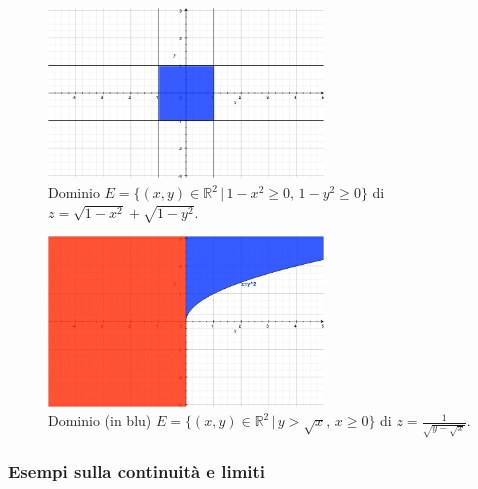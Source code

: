 \begin{example}
    \begin{figure}
    \centering
    \includegraphics[width=0.65\textwidth]{Analisi2/figures/dominio_rad_1-x^2+rad_1-y^2.jpg}
        \caption{Dominio $E=\{(x,y)\in\mathbb R^2\,|\, 1-x^2\geq 0,\, 1-y^2\geq 0\}$ di $z=\sqrt{1-x^2}+\sqrt{1-y^2}$.}\label{fig:dominio_rad_1-x^2+rad_1-y^2}
    \end{figure}

    \begin{figure}
    \centering
    \includegraphics[width=0.65\textwidth]{Analisi2/figures/domino_frac_1_rad_y-radx.jpg}
        \caption{Dominio (in blu) $E=\{(x,y)\in\mathbb R^2\,|\, y>\sqrt{x},\, x\geq 0\}$ di $z=\frac{1}{\sqrt{y-\sqrt{x}}}$.}\label{fig:domino_frac_1_rad_y-radx}
    \end{figure}
\end{example}

\subsubsection{Esempi sulla continuità e limiti}


